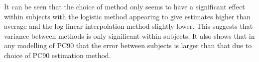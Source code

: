 It can be seen that the choice of method only seems to have a significant effect within subjects with the logistic method appearing to give estimates higher than average and the log-linear interpolation method slightly lower. This suggests that variance between methods is only significant within subjects. It also shows that in any modelling of PC90 that the error between subjects is larger than that due to choice of PC90 estimation method.
\clearpage
